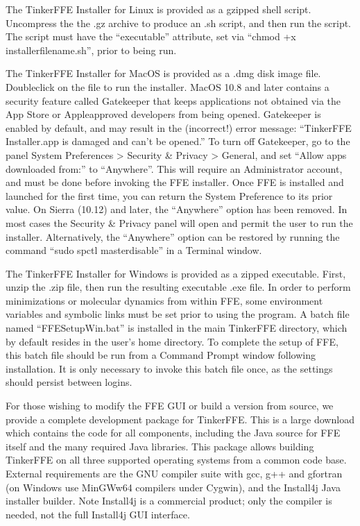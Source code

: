 \documentclass[letterpaper,11pt,english]{sphinxmanual}
\begin{document}
The Tinker\sphinxhyphen{}FFE Installer for Linux is provided as a gzipped shell script. Uncompress the the .gz archive to produce an .sh script, and then run the script. The script must have the “executable” attribute, set via “chmod +x installer\sphinxhyphen{}file\sphinxhyphen{}name.sh”, prior to being run.

The Tinker\sphinxhyphen{}FFE Installer for MacOS is provided as a .dmg disk image file. Double\sphinxhyphen{}click on the file to run the installer. MacOS 10.8 and later contains a security feature called Gatekeeper that keeps applications not obtained via the App Store or Apple\sphinxhyphen{}approved developers from being opened. Gatekeeper is enabled by default, and may result in the (incorrect!) error message: “Tinker\sphinxhyphen{}FFE Installer.app is damaged and can’t be opened.” To turn off Gatekeeper, go to the panel System Preferences \textgreater{} Security \& Privacy \textgreater{} General, and set “Allow apps downloaded from:” to “Anywhere”. This will require an Administrator account, and must be done before invoking the FFE installer. Once FFE is installed and launched for the first time, you can return the System Preference to its prior value. On Sierra (10.12) and later, the “Anywhere” option has been removed. In most cases the Security \& Privacy panel will open and permit the user to run the installer. Alternatively, the “Anywhere” option can be restored by running the command “sudo spctl \textendash{}master\sphinxhyphen{}disable” in a Terminal window.

The Tinker\sphinxhyphen{}FFE Installer for Windows is provided as a zipped executable. First, unzip the .zip file, then run the resulting executable .exe file. In order to perform minimizations or molecular dynamics from within FFE, some environment variables and symbolic links must be set prior to using the program. A batch file named “FFESetupWin.bat” is installed in the main Tinker\sphinxhyphen{}FFE directory, which by default resides in the user’s home directory. To complete the setup of FFE, this batch file should be run from a Command Prompt window following installation. It is only necessary to invoke this batch file once, as the settings should persist between logins.

For those wishing to modify the FFE GUI or build a version from source, we provide a complete development package for Tinker\sphinxhyphen{}FFE. This is a large download which contains the code for all components, including the Java source for FFE itself and the many required Java libraries. This package allows building Tinker\sphinxhyphen{}FFE on all three supported operating systems from a common code base. External requirements are the GNU compiler suite with gcc, g++ and gfortran (on Windows use MinGW\sphinxhyphen{}w64 compilers under Cygwin), and the Install4j Java installer builder. Note Install4j is a commercial product; only the compiler is needed, not the full Install4j GUI interface.
\end{document}
